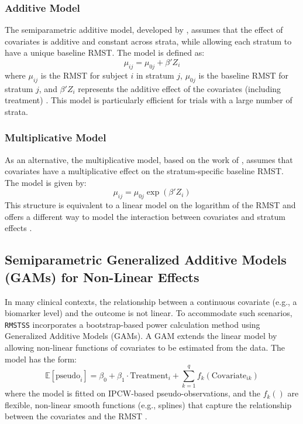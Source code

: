 \documentclass[11pt, a4paper]{article}
\begin{document}
\subsubsection{Additive Model}
The semiparametric additive model, developed by \citet{zhang2024}, assumes that the effect of covariates is additive and constant across strata, while allowing each stratum to have a unique baseline RMST. The model is defined as:
\begin{equation}
\mu_{ij} = \mu_{0j} + \beta'Z_i
\end{equation}
where $\mu_{ij}$ is the RMST for subject $i$ in stratum $j$, $\mu_{0j}$ is the baseline RMST for stratum $j$, and $\beta'Z_i$ represents the additive effect of the covariates (including treatment) \cite{[1]}. This model is particularly efficient for trials with a large number of strata.

\subsubsection{Multiplicative Model}
As an alternative, the multiplicative model, based on the work of \citet{wang2019}, assumes that covariates have a multiplicative effect on the stratum-specific baseline RMST. The model is given by:
\begin{equation}
\mu_{ij} = \mu_{0j} \exp(\beta'Z_i)
\end{equation}
This structure is equivalent to a linear model on the logarithm of the RMST and offers a different way to model the interaction between covariates and stratum effects \cite{[1]}.

\subsection{Semiparametric Generalized Additive Models (GAMs) for Non-Linear Effects}
In many clinical contexts, the relationship between a continuous covariate (e.g., a biomarker level) and the outcome is not linear. To accommodate such scenarios, \texttt{RMSTSS} incorporates a bootstrap-based power calculation method using Generalized Additive Models (GAMs). A GAM extends the linear model by allowing non-linear functions of covariates to be estimated from the data. The model has the form:
\begin{equation}
\mathbb{E}[\text{pseudo}_i] = \beta_0 + \beta_1 \cdot \text{Treatment}_i + \sum_{k=1}^{q} f_k(\text{Covariate}_{ik})
\end{equation}
where the model is fitted on IPCW-based pseudo-observations, and the $f_k()$ are flexible, non-linear smooth functions (e.g., splines) that capture the relationship between the covariates and the RMST \cite{[1]}.
\end{document}
